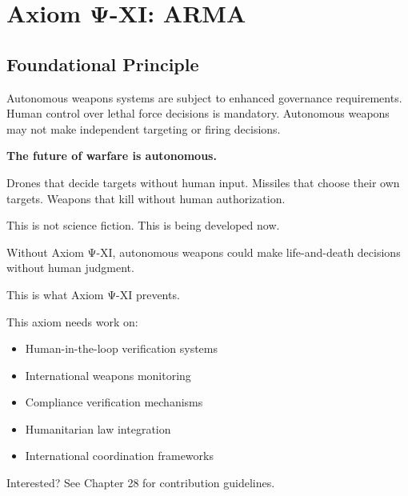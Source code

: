 
\chapter{Axiom Ψ-XI: ARMA}
\label{ch:axiom-XI}

\section*{Foundational Principle}

\begin{principlebox}
Autonomous weapons systems are subject to enhanced governance requirements. Human control over lethal force decisions is mandatory. Autonomous weapons may not make independent targeting or firing decisions.
\end{principlebox}

\vspace{0.5cm}

\begin{tcolorbox}[colback=lightgray, colframe=legislativeblue, title=\textbf{📖 Why This Axiom Matters}]
\textbf{The future of warfare is autonomous.}

Drones that decide targets without human input. Missiles that choose their own targets. Weapons that kill without human authorization.

This is not science fiction. This is being developed now.

Without Axiom Ψ-XI, autonomous weapons could make life-and-death decisions without human judgment.

This is what Axiom Ψ-XI prevents.
\end{tcolorbox}

\vspace{0.5cm}

\begin{tcolorbox}[colback=lightgray, colframe=accentgold, title=\textbf{🎯 Contribution Opportunity}]
This axiom needs work on:
\begin{itemize}
    \item Human-in-the-loop verification systems
    \item International weapons monitoring
    \item Compliance verification mechanisms
    \item Humanitarian law integration
    \item International coordination frameworks
\end{itemize}

Interested? See Chapter 28 for contribution guidelines.
\end{tcolorbox}

